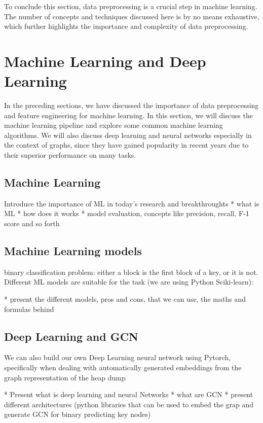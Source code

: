     To conclude this section, data preprocessing is a crucial step in machine learning. The number of concepts and techniques discussed here is by no means exhaustive, which further highlights the importance and complexity of data preprocessing. 

\section{Machine Learning and Deep Learning}\label{sec:background:ml}
    In the preceding sections, we have discussed the importance of data preprocessing and feature engineering for machine learning. In this section, we will discuss the machine learning pipeline and explore some common machine learning algorithms. We will also discuss deep learning and neural networks especially in the context of graphs, since they have gained popularity in recent years due to their superior performance on many tasks.

    \subsection{Machine Learning}
    Introduce the importance of ML in today's research and breakthroughts
    * what is ML
    * how does it works
    * model evaluation, concepts like precision, recall, F-1 score and so forth

    \subsection{Machine Learning models}
    binary classification problem: either a block is the first block of a key, or it is not. Different ML models are suitable for the task (we are using Python Sciki-learn):

    * present the different models, pros and cons, that we can use, the maths and formulas behind

    \subsection{Deep Learning and GCN}
    We can also build our own Deep Learning neural network using Pytorch, specifically when dealing with automatically generated embeddings from the graph representation of the heap dump

    * Present what is deep learning and neural Networks
    * what are GCN
    * present different architectures (python libraries that can be used to embed the grap and generate GCN for binary predicting key nodes)

